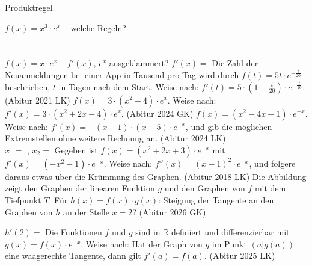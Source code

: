 \setcounter{aufgabe}{16}

\begin{aufgabe}{Produktregel}
\begin{teile}
\teil $f(x) = x^3 \cdot e^x$ – welche Regeln? \\  \\  \\ 
\teil $f(x) = x \cdot e^x$ – $f'(x)$, $e^x$ ausgeklammert? $f'(x) =$ \leerfeld
\teil Die Zahl der Neuanmeldungen bei einer App in Tausend pro Tag wird durch $f(t) = 5t \cdot e^{-\frac{t}{20}}$ beschrieben, $t$ in Tagen nach dem Start. Weise nach: $f'(t) = 5 \cdot (1 - \frac{t}{20}) \cdot e^{-\frac{t}{20}}$. \hfill (Abitur 2021 LK)
\teil $f(x) = 3 \cdot (x^2 - 4) \cdot e^x$. Weise nach: $f'(x) = 3 \cdot (x^2 + 2x - 4) \cdot e^x$. \hfill (Abitur 2024 GK)
\teil $f(x) = (x^2 - 4x + 1) \cdot e^{-x}$. Weise nach: $f'(x) = -(x - 1) \cdot (x - 5) \cdot e^{-x}$, und gib die möglichen Extremstellen ohne weitere Rechnung an. \hfill (Abitur 2024 LK) \\ $x_1 =$ \leerfeld , $x_2 =$ \leerfeld
\teil Gegeben ist $f(x) = (x^2 + 2x + 3) \cdot e^{-x}$ mit $f'(x) = (-x^2 - 1) \cdot e^{-x}$. Weise nach: $f''(x) = (x - 1)^2 \cdot e^{-x}$, und folgere daraus etwas über die Krümmung des Graphen. \hfill (Abitur 2018 LK)
\teil Die Abbildung zeigt den Graphen der linearen Funktion $g$ und den Graphen von $f$ mit dem Tiefpunkt $T$. Für $h(x) = f(x) \cdot g(x)$: Steigung der Tangente an den Graphen von $h$ an der Stelle $x = 2$? \hfill (Abitur 2026 GK) \\

\begin{ksys}[xmin=-1,xmax=6,ymin=-2,ymax=6,ablesen]    \end{ksys}
$h'(2) =$ \leerfeld
\teil Die Funktionen $f$ und $g$ sind in $\mathbb{R}$ definiert und differenzierbar mit $g(x) = f(x) \cdot e^{-x}$. Weise nach: Hat der Graph von $g$ im Punkt $(a|g(a))$ eine waagerechte Tangente, dann gilt $f'(a) = f(a)$. \hfill (Abitur 2025 LK)
\end{teile}
\end{aufgabe}

